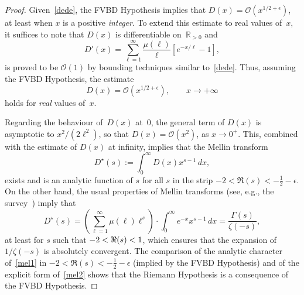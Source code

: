 \documentclass{amsart}
\def\R{\mathbb{R}}
\def\ds{\displaystyle}
\def\O{\mathcal{O}}
\begin{document}
\begin{proof}
Given~\eqref{dede}, the FVBD Hypothesis implies that $D(x)=\O(x^{1/2+\epsilon})$,
at least when $x$ is a positive \emph{integer}. To extend this estimate to real values of~$x$, 
it suffices to note that $D(x)$ is differentiable on~$\R_{>0}$ and
\[
D'(x)=\sum_{\ell=1}^\infty \frac{\mu(\ell)}{\ell}\left[e^{-x/\ell}-1\right],
\]
is proved to be $\O(1)$ by bounding techniques similar to~\eqref{dede}.
% 
Thus, assuming the FVBD Hypothesis, the estimate
\[
D(x)=\O\left(x^{1/2+\epsilon}\right), \qquad x\to+\infty
\]
holds for \emph{real} values of~$x$.


Regarding the behaviour of~$D(x)$ at~$0$,
the general term of $D(x)$ is asymptotic to $x^2/(2\ell^2)$, so that $D(x)=\O(x^2)$,
as $x\to0^{+}$. This, combined with the estimate of $D(x)$ at infinity, implies that
the Mellin transform
\begin{equation}\label{mel1}
D^\star(s):=\int_0^\infty D(x) x^{s-1}\, dx,
\end{equation}
exists and is an analytic function of $s$ for all $s$ in the strip $-2<\Re(s)<-\frac12-\epsilon$.
On the other hand, the usual properties of Mellin transforms (see, e.g., the survey~\cite{FlGoDu95})
imply that 
\begin{equation}\label{mel2}
D^\star(s)=\left(\sum_{\ell=1}^\infty \mu(\ell)\ell^{s}\right)
\cdot \int_0^\infty e^{-x}x^{s-1}\, dx =\frac{\Gamma(s)}{\zeta(-s)},
\end{equation}
at least for $s$ such that $-2<\Re(s)<\-1$, which ensures that the expansion of $1/\zeta(-s)$
is absolutely convergent. The comparison of the analytic character of~\eqref{mel1} in
$-2<\Re(s)<-\frac12-\epsilon$ (implied by the FVBD Hypothesis) and of the explicit form of~\eqref{mel2}
shows that the Riemann Hypothesis is a consequence of the FVBD Hypothesis.
\end{proof}
\end{document}
